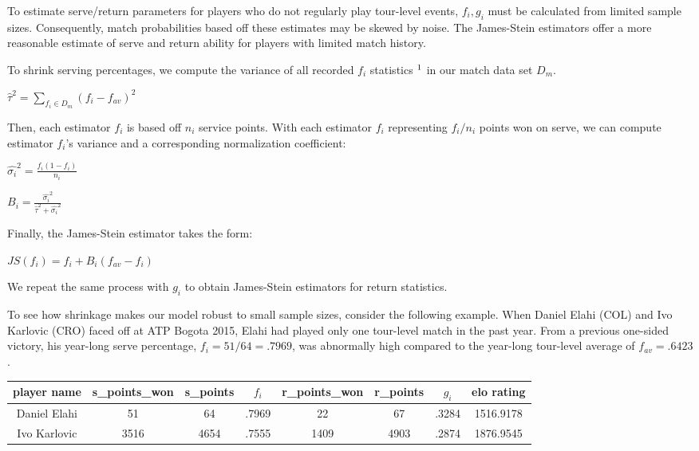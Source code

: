 \documentclass[chapterprefix=false]{report}
\begin{document}
To estimate serve/return parameters for players who do not regularly play tour-level events, $f_i,g_i$ must be calculated from limited sample sizes. Consequently, match probabilities based off these estimates may be skewed by noise. The James-Stein estimators offer a more reasonable estimate of serve and return ability for players with limited match history. 


To shrink serving percentages, we compute the variance of all recorded $f_i$ statistics $\footnote{each ${f_i}$ is computed from the previous twelve months of player data}$ in our match data set $D_m$.

\begin{center}
$\hat{\tau}^2 = \sum_{f_i \in D_m} (f_i-f_{av})^2$
\end{center}

Then, each estimator $f_i$ is based off $n_i$ service points. With each estimator $f_i$ representing $f_i/n_i$ points won on serve, we can compute estimator $f_i$'s variance and a corresponding normalization coefficient:

\begin{center}
\large{$\hat{\sigma_i}^2 = \frac{f_i(1-f_i)}{n_i}$}

\large{$B_i = \frac{\hat{\sigma_i}^2}{\hat{\tau}^2+\hat{\sigma_i}^2}$}
\end{center}

Finally, the James-Stein estimator takes the form: 

\begin{center}
$JS(f_i) = f_i + B_i(f_{av}-f_i)$
\end{center}

We repeat the same process with $g_i$ to obtain James-Stein estimators for return statistics.

To see how shrinkage makes our model robust to small sample sizes, consider the following example. When Daniel Elahi (COL) and Ivo Karlovic (CRO) faced off at ATP Bogota 2015, Elahi had played only one tour-level match in the past year. From a previous one-sided victory, his year-long serve percentage, $f_i=51/64=.7969$, was abnormally high compared to the year-long tour-level average of $f_{av}=.6423$. 


\begin{center}
\begin{tabular}{ |c|c|c|c|c|c|c|c| } 
 \hline
 player name & s\_points\_won & s\_points
 & $f_i$ & r\_points\_won & r\_points & $g_i$ & elo rating \\ 
 \hline
 Daniel Elahi & 51 & 64 & .7969 & 22 & 67 & .3284 & 1516.9178 
 \\
 \hline
 Ivo Karlovic & 3516 & 4654 & .7555 & 1409 & 4903 & .2874 & 1876.9545 \\ 
 \hline
\end{tabular}
\end{center}
\end{document}
